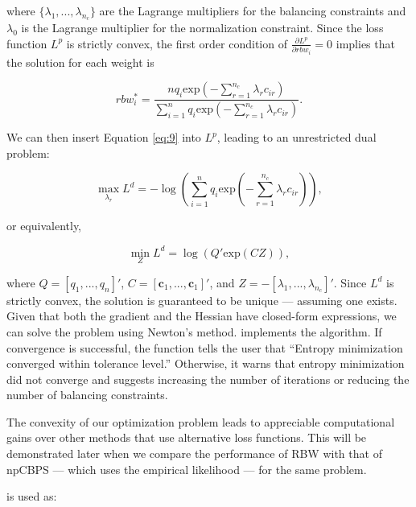 where \(\{\lambda_{1},...,\lambda_{n_{c}}\}\) are the Lagrange
multipliers for the balancing constraints and \(\lambda_{0}\) is the
Lagrange multiplier for the normalization constraint. Since the loss
function \(L^{p}\) is strictly convex, the first order condition of
\(\frac{\partial L^{p}}{\partial rbw_{i}}=0\) implies that the solution
for each weight is

\begin{equation}
\label{eq:9}
rbw_{i}^{*}=\frac{nq_{i}\text{exp}(-\sum^{n_{c}}_{r=1}\lambda_{r}c_{ir})}{\sum^{n}_{i=1}q_{i}\text{exp}(-\sum^{n_{c}}_{r=1}\lambda_{r}c_{ir})}.
\end{equation}

We can then insert Equation \ref{eq:9} into \(L^{p}\), leading to an
unrestricted dual problem:

\begin{equation}
\label{eq:10}
\max_{\lambda_{r}}L^{d}=-\log \left(\sum^{n}_{i=1}q_{i}\text{exp}\left(-\sum^{n_{c}}_{r=1}\lambda_{r}c_{ir}\right)\right),
\end{equation}

or equivalently,

\begin{equation}
\label{eq:11}
\min_{Z}L^{d}=\log \left(Q'\text{exp}(CZ)\right),
\end{equation}

where \(Q=[q_{1},...,q_{n}]'\),
\(C=[\boldsymbol{c}_{1},...,\boldsymbol{c}_{1}]'\), and
\(Z=-[\lambda_{1},...,\lambda_{n_{c}}]'\). Since \(L^{d}\) is strictly
convex, the solution is guaranteed to be unique --- assuming one exists.
Given that both the gradient and the Hessian have closed-form
expressions, we can solve the problem using Newton's method.
 implements the algorithm. If convergence is successful, the
function tells the user that ``Entropy minimization converged within
tolerance level.'' Otherwise, it warns that entropy minimization did not
converge and suggests increasing the number of iterations or reducing
the number of balancing constraints.

The convexity of our optimization problem leads to appreciable
computational gains over other methods that use alternative loss
functions. This will be demonstrated later when we compare the
performance of RBW with that of npCBPS --- which uses the empirical
likelihood --- for the same problem.

 is used as:


